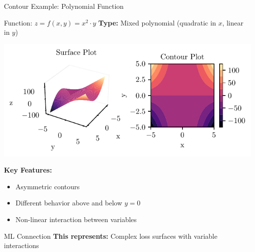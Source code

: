 \documentclass[10pt]{beamer}
\newcommand{\fitpic}[1]{\begin{adjustbox}{max width=\linewidth, max totalheight=0.78\textheight}#1\end{adjustbox}}
\begin{document}
\begin{frame}{Contour Example: Polynomial Function}
\begin{examplebox}{Function: $z = f(x,y) = x^2 \cdot y$}
\textbf{Type:} Mixed polynomial (quadratic in $x$, linear in $y$)
\end{examplebox}

\begin{center}
\fitpic{\includegraphics[width=0.8\linewidth]{../assets/mathematical-ml/figures/contour-x_square_times_y.pdf}}
\end{center}

\begin{keypointsbox}
\textbf{Key Features:}
\begin{itemize}
\item Asymmetric contours
\item Different behavior above and below $y = 0$
\item Non-linear interaction between variables
\end{itemize}
\end{keypointsbox}

\begin{alertbox}{ML Connection}
\textbf{This represents:} Complex loss surfaces with variable interactions
\end{alertbox}
\end{frame}
\end{document}
